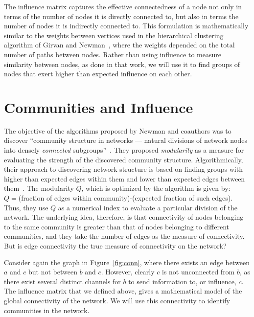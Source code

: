 \documentclass{sig-alternate}
\newcommand{\figref}[1]{Figure~\ref{#1}}
\begin{document}
The influence matrix captures the effective connectedness of a node not only in terms of the number of nodes  it  is directly connected to, but also in terms the number of nodes it is indirectly connected to.
This formulation is mathematically similar to the weights between vertices used in the hierarchical clustering  algorithm of Girvan and Newman~\cite{GirvanNewman02}, where the weights depended on the total number of paths between nodes.
Rather than using influence to measure similarity between nodes, as done in that work, we will use it to find groups of nodes that exert higher than expected influence on each other.



\section{Communities and Influence}
\label{sec:modularity}

The objective of the algorithms proposed by  Newman and coauthors was to discover ``community structure in networks --- natural divisions of network nodes into densely \emph{connected} subgroups''~\cite{GirvanNewman04}. They proposed \emph{modularity} as a measure for evaluating the strength of the discovered community structure. Algorithmically, their approach to discovering network structure is based on finding groups with higher than expected edges within them and lower than expected edges between them~\cite{Newman104,Newman204,Newman106,Newman206}. The modularity $Q$, which is optimized by the algorithm is given by:\\
 $Q=$(fraction of edges within community)-(expected fraction of such edges). \\
Thus, they use $Q$ as a numerical index to evaluate a particular division of the network. The underlying idea, therefore, is that connectivity of nodes belonging to the same community is greater than that of nodes belonging to different communities, and they take the number of edges as the measure of connectivity. But is edge connectivity the true measure of connectivity on the network?

Consider again the graph in \figref{fig:conn}, where there exists an edge between $a$ and $c$ but not between $b$ and $c$. However, clearly $c$ is not unconnected from $b$, as there exist several distinct channels for $b$ to send information to, or influence, $c$.
The influence matrix that we defined above, gives a mathematical model of the global connectivity of the network. We will use this connectivity to identify communities in the network.
\end{document}
